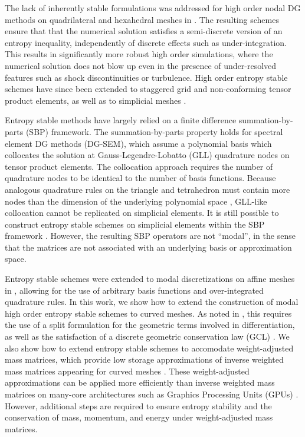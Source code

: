 \documentclass[10pt]{amsart}
\theoremstyle{definition}
\theoremstyle{lemma}
\theoremstyle{theorem}
\theoremstyle{assumption}
\begin{document}
The lack of inherently stable formulations was addressed for high order nodal DG methods on quadrilateral and hexahedral meshes in \cite{fisher2013high, carpenter2014entropy}.  The resulting schemes ensure that that the numerical solution satisfies a semi-discrete version of an entropy inequality, independently of discrete effects such as under-integration.  This results in significantly more robust high order simulations, where the numerical solution does not blow up even in the presence of under-resolved features such as shock discontinuities or turbulence.  High order entropy stable schemes have since been extended to staggered grid and non-conforming \cite{parsani2016entropy, friedrich2017entropy} tensor product elements, as well as to simplicial meshes \cite{chen2017entropy, chan2017discretely, crean2018entropy}.  

Entropy stable methods have largely relied on a finite difference summation-by-parts (SBP) framework.  The summation-by-parts property holds for spectral element DG methods (DG-SEM), which assume a polynomial basis which collocates the solution at Gauss-Legendre-Lobatto (GLL) quadrature nodes on tensor product elements.  The collocation approach requires the number of quadrature nodes to be identical to the number of basis functions.  Because analogous quadrature rules on the triangle and tetrahedron must contain more nodes than the dimension of the underlying polynomial space \cite{helenbrook2009existence, hicken2016multidimensional}, GLL-like collocation cannot be replicated on simplicial elements.  It is still possible to construct entropy stable schemes on simplicial elements within the SBP framework \cite{chen2017entropy, crean2018entropy}.   However, the resulting SBP operators are not ``modal'', in the sense that the matrices are not associated with an underlying basis or approximation space.  

Entropy stable schemes were extended to modal discretizations on affine meshes in \cite{chan2017discretely}, allowing for the use of arbitrary basis functions and over-integrated quadrature rules.  In this work, we show how to extend the construction of modal high order entropy stable schemes to curved meshes.  As noted in \cite{crean2018entropy}, this requires the use of a split formulation for the geometric terms involved in differentiation, as well as the satisfaction of a discrete geometric conservation law (GCL) \cite{thomas1979geometric, kopriva2006metric}.  We also show how to extend entropy stable schemes to accomodate weight-adjusted mass matrices, which provide low storage approximations of inverse weighted mass matrices appearing for curved meshes \cite{chan2016weight2}.  These weight-adjusted approximations can be applied more efficiently than inverse weighted mass matrices on many-core architectures such as Graphics Processing Units (GPUs) \cite{chan2017weight}.   However, additional steps are required to ensure entropy stability and the conservation of mass, momentum, and energy under weight-adjusted mass matrices.
\end{document}
